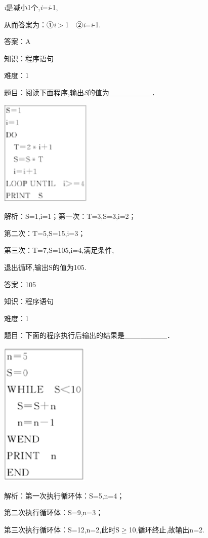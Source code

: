 \documentclass{article} %
\begin{document}
\textit{i}是减小1个,\textit{i}=\textit{i}-1,

从而答案为：①\textit{i}$\mathrm{>}$1　②\textit{i}=\textit{i}-1.

答案：A

知识：程序语句

难度：1

题目：阅读下面程序,输出\textit{S}的值为\_\_\_\_\_\_\_\_．

\includegraphics*[width=1.71in, height=2.00in, keepaspectratio=false]{image64}

解析：S=1,i=1；第一次：T=3,S=3,i=2；

第二次：T=5,S=15,i=3；

第三次：T=7,S=105,i=4,满足条件,

退出循环,输出S的值为105.

答案：105

知识：程序语句

难度：1

题目：下面的程序执行后输出的结果是\_\_\_\_\_\_\_\_．

\includegraphics*[width=1.66in, height=2.75in, keepaspectratio=false]{image65}

解析：第一次执行循环体：S=5,n=4；

第二次执行循环体：S=9,n=3；

第三次执行循环体：S=12,n=2,此时S$\mathrm{\ge}$10,循环终止,故输出n=2.
\end{document}
